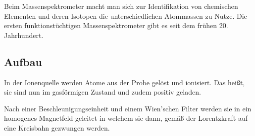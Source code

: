 




%
%	





Beim Massenspektrometer macht man sich zur Identifikation von chemischen Elementen und deren Isotopen die unterschiedlichen Atommassen zu Nutze. Die ersten funktionstüchtigen Massenspektrometer gibt es seit dem frühen 20. Jahrhundert.

\subsection{Aufbau}

In der Ionenquelle werden Atome aus der Probe gelöst und ionisiert. Das heißt, sie sind nun im gasförmigen Zustand und zudem positiv geladen.

Nach einer Beschleunigungseinheit und einem Wien'schen Filter werden sie in ein homogenes Magnetfeld geleitet in welchem sie dann, gemäß der Lorentzkraft auf eine Kreisbahn gezwungen werden. 

